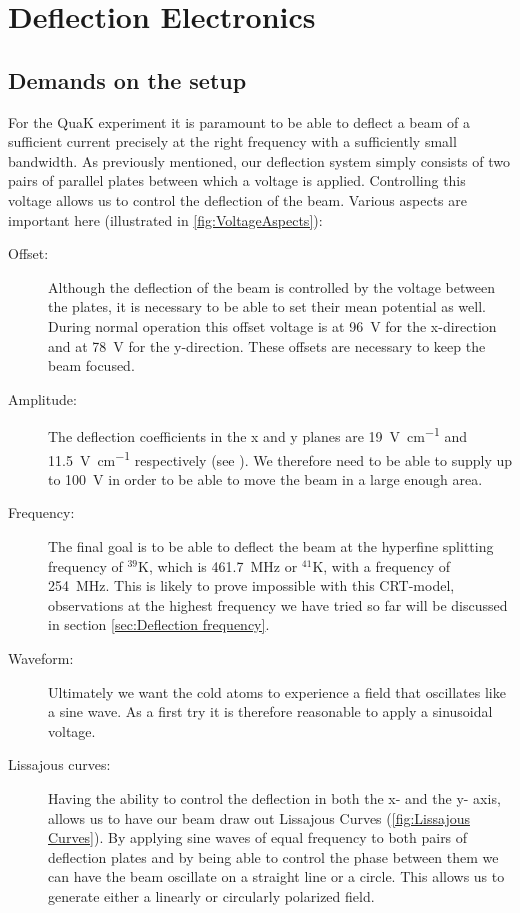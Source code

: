 
\chapter{Deflection Electronics}

\section{Demands on the setup}

For the QuaK experiment it is paramount to be able to deflect a beam of a sufficient current precisely at the right frequency with a sufficiently small bandwidth. 
As previously mentioned, our deflection system simply consists of two pairs of parallel plates between which a voltage is applied. Controlling this voltage allows us to control the deflection of the beam. Various aspects are important here (illustrated in \cref{fig:VoltageAspects}):

\begin{description}
	
	\item[Offset:] Although the deflection of the beam is controlled by the voltage between the plates, it is necessary to be able to set their mean potential as well. During normal operation this offset voltage is at \SI{96}{\volt} for the x-direction and at \SI{78}{\volt} for the y-direction. These offsets are necessary to keep the beam focused.
	\item[Amplitude:] The deflection coefficients in the x and y planes are \SI{19}{\volt\per\centi\meter} and \SI{11.5}{\volt\per\centi\meter} respectively (see \cite{D14363GY123-manual}). We therefore need to be able to supply up to \SI{100}{\volt} in order to be able to move the beam in a large enough area.
	\item[Frequency:] The final goal is to be able to deflect the beam at the hyperfine splitting frequency of $^{39}\mathrm{K}$, which is \SI{461.7}{\mega\hertz} or $^{41}\mathrm{K}$, with a frequency of \SI{254}{\mega\hertz}. This is likely to prove impossible with this CRT-model, observations at the highest frequency we have tried so far will be discussed in section \cref{sec:Deflection frequency}.
	\item[Waveform:] Ultimately we want the cold atoms to experience a field that oscillates like a sine wave. As a first try it is therefore reasonable to apply a sinusoidal voltage.
	\item[Lissajous curves:] Having the ability to control the deflection in both the x- and the y- axis, allows us to have our beam draw out Lissajous Curves (\cref{fig:Lissajous Curves}). By applying sine waves of equal frequency to both pairs of deflection plates and by being able to control the phase between them we can have the beam oscillate on a straight line or a circle. This allows us to generate either a linearly or circularly polarized field.
\end{description}

